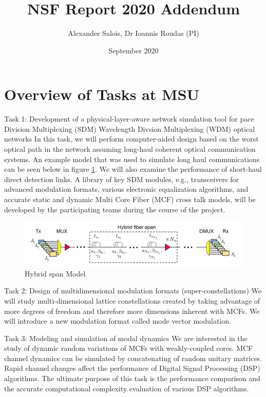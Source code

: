 \documentclass{report}
\title{NSF Report 2020 Addendum}
\author{Alexander Salois, Dr Ioannis Roudas (PI)}
\date{September 2020}
\begin{document}
 
\maketitle

\section{Overview of Tasks at MSU}
Task 1: Development of a physical-layer-aware network simulation tool for pace Division Multiplexing (SDM) Wavelength Divsion Multiplexing (WDM) optical networks
In this task, we will perform computer-aided design based on the worst optical path in the network assuming long-haul coherent optical communication systems.  An example model that was used to simulate long haul communications can be seen below in figure \ref{fig:hybrid_spans}. We will also examine the performance of short-haul direct detection links. A library of key SDM modules, e.g., transceivers for advanced modulation formats, various electronic equalization algorithms, and accurate static and dynamic Multi Core Fiber (MCF) cross talk models, will be developed by the participating teams during the course of the project.

\begin{figure}[h!]
\centering
\includegraphics[scale=0.4]{BlockDiagramHybridFiberSpans_Nf.png}
\caption{Hybrid span Model}
\label{fig:hybrid_spans}
\end{figure}


Task 2: Design of multidimensional modulation formats (super-constellations)
We will study multi-dimensional lattice constellations created by taking advantage of more degrees of freedom and therefore more dimensions inherent with MCFs.  We will introduce a new modulation format called mode vector modulation.


Task 3: Modeling and simulation of modal dynamics
We are interested in the study of dynamic random variations of MCFs with weakly-coupled cores. MCF channel dynamics can be simulated by concatenating of random unitary matrices. Rapid channel changes affect the performance of Digital Signal Processing (DSP) algorithms. The ultimate purpose of this task is the performance comparison and the accurate computational complexity evaluation of various DSP algorithms.
\end{document}
